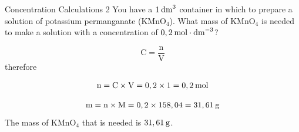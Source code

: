       \begin{wex}{Concentration Calculations 2 }
{
You have a $1\phantom{\rule{2pt}{0ex}}{\text{dm}}^{3}$ container in which to prepare a solution of potassium permanganate ($\text{KMnO}{}_{4}$). What mass of $\text{KMnO}{}_{4}$ is needed to make a solution with a concentration of $0,2\phantom{\rule{2pt}{0ex}}\text{mol}\cdot \text{dm}^{-3}$? 
      \vspace{5pt}}
{
      \label{m38712*id283297}\nopagebreak\noindent{}
        
    \begin{equation*}
    \text{C}=\frac{\text{n}}{\text{V}}
      \end{equation*}
      \label{m38712*id283318}therefore
      \label{m38712*id283321}\nopagebreak\noindent{}
        
    \begin{equation*}
    \text{n}=\text{C}\ensuremath{\times}\text{V}=0,2\ensuremath{\times}1=0,2\phantom{\rule{2pt}{0ex}}\text{mol}
      \end{equation*}
      \label{m38712*id283387}\nopagebreak\noindent{}
        
    \begin{equation*}
    \text{m}=\text{n}\ensuremath{\times}\text{M}=0,2\ensuremath{\times}158,04=31,61\phantom{\rule{2pt}{0ex}}\text{g}
      \end{equation*}
      \label{m38712*id283435}The mass of $\text{KMnO}{}_{4}$ that is needed is $31,61\phantom{\rule{2pt}{0ex}}\text{g}$.
 
}
    \end{wex}
    \noindent
\label{m38712*secfhsst!!!underscore!!!id1795}\vspace{-2cm} 

